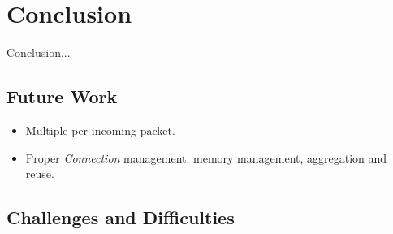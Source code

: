 \chapter{Conclusion}
\label{cap:conclusion}



Conclusion...

\section{Future Work}


\begin{itemize}
    \item Multiple \Offloaders{} per incoming packet.
    \item Proper \textit{Connection} management: memory management, aggregation and reuse.
\end{itemize}


\section{Challenges and Difficulties}


% 
